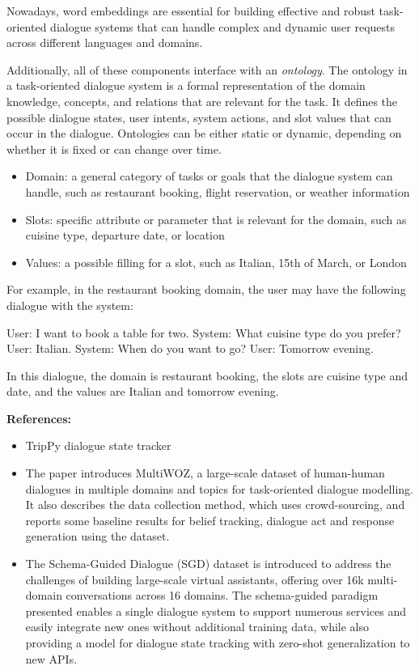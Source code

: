 \documentclass[11pt, a4paper]{amsart}
\begin{document}
Nowadays, word embeddings are essential for building effective and robust task-oriented dialogue systems that can handle complex and dynamic user requests across different languages and domains.

Additionally, all of these components interface with an \emph{ontology}.
The ontology in a task-oriented dialogue system is a formal representation of the domain knowledge, concepts, and relations that are relevant for the task.
It defines the possible dialogue states, user intents, system actions, and slot values that can occur in the dialogue.
Ontologies can be either static or dynamic, depending on whether it is fixed or can change over time.

\begin{itemize}
	\item Domain: a general category of tasks or goals that the dialogue system can handle, such as restaurant booking, flight reservation, or weather information
	\item Slots: specific attribute or parameter that is relevant for the domain, such as cuisine type, departure date, or location
	\item Values: a possible filling for a slot, such as Italian, 15th of March, or London
\end{itemize}

For example, in the restaurant booking domain, the user may have the following dialogue with the system:

User: I want to book a table for two. System: What cuisine type do you prefer? User: Italian. System: When do you want to go? User: Tomorrow evening.

In this dialogue, the domain is restaurant booking, the slots are cuisine type and date, and the values are Italian and tomorrow evening.

\noindent \textbf{References:}
\begin{itemize}
	\item TripPy dialogue state tracker \cite{heck-etal-2020-trippy}
	\item The paper \cite{budzianowski-etal-2018-multiwoz} introduces MultiWOZ, a large-scale dataset of human-human dialogues in multiple domains and topics for task-oriented dialogue modelling.
	It also describes the data collection method, which uses crowd-sourcing, and reports some baseline results for belief tracking, dialogue act and response generation using the dataset.
	\item The Schema-Guided Dialogue (SGD) dataset \cite{rastogi2020towards} is introduced to address the challenges of building large-scale virtual assistants, offering over 16k multi-domain conversations across 16 domains.
	The schema-guided paradigm presented enables a single dialogue system to support numerous services and easily integrate new ones without additional training data, while also providing a model for dialogue state tracking with zero-shot generalization to new APIs.
\end{itemize}
\end{document}
